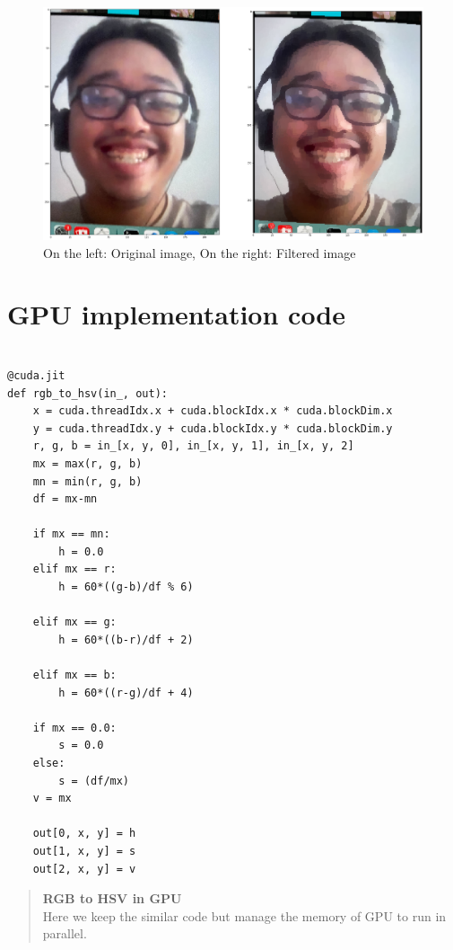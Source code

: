 \documentclass[a4paper,11pt]{article}
\theoremstyle{mytheor}
\begin{document}
\begin{figure}[h]
    \centering
    \includegraphics[width=1\textwidth]{images/CPU.png}
    \caption{On the left: Original image, On the right: Filtered image}
    \label{fig:CPU}
\end{figure}

\section*{GPU implementation code}

\begin{lstlisting}[caption=RGB to HSV conversion with GPU]

@cuda.jit
def rgb_to_hsv(in_, out):
    x = cuda.threadIdx.x + cuda.blockIdx.x * cuda.blockDim.x
    y = cuda.threadIdx.y + cuda.blockIdx.y * cuda.blockDim.y
    r, g, b = in_[x, y, 0], in_[x, y, 1], in_[x, y, 2]
    mx = max(r, g, b)
    mn = min(r, g, b)
    df = mx-mn

    if mx == mn:
        h = 0.0
    elif mx == r:
        h = 60*((g-b)/df % 6)
        
    elif mx == g:
        h = 60*((b-r)/df + 2)
        
    elif mx == b:
        h = 60*((r-g)/df + 4)
        
    if mx == 0.0:
        s = 0.0
    else:
        s = (df/mx)
    v = mx

    out[0, x, y] = h 
    out[1, x, y] = s
    out[2, x, y] = v
\end{lstlisting}



\begin{quote}
\textbf{RGB to HSV in GPU\\}
Here we keep the similar code but manage the memory of GPU to run in parallel.
\end{quote}
\end{document}
